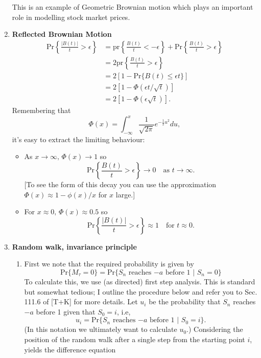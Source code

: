 \documentclass[11pt,a4paper]{article}
\begin{document}
\begin{enumerate}
    This is an example of Geometric Brownian motion which plays an important role in modelling stock market prices.
    \item \textbf{Reflected Brownian Motion}
    \begin{align*}
      \text{Pr}\left\{\frac{|B(t)|}{t} > \epsilon \right\}
      &= \text{pr}\left\{\frac{B(t)}{t}< - \epsilon\right\} + \text{Pr}\left\{\frac{B(t)}{t} > \epsilon\right\}\\
      &= 2\text{pr}\left\{\frac{B(t)}{t} > \epsilon\right\}\\
      &= 2[1 - \text{Pr}\{B(t) \leq \epsilon t\}]\\
      &= 2[1 - \Phi(\epsilon t/\sqrt{t})]\\
      &= 2[1 - \Phi(\epsilon\sqrt{t})].
    \end{align*}
    Remembering that
    $$
    \Phi(x) = \int_{-\infty}^x\frac{1}{\sqrt{2\pi}}e^{-\frac{1}{2}u^2}du,
    $$
    it's easy to extract the limiting behaviour:
    \begin{itemize}
      \item As $x \to \infty,\, \Phi(x)\to 1$ so 
      $$
      \text{Pr}\left\{\frac{B(t)}{t} > \epsilon\right\}\to 0 \quad\text{as $t \to \infty$}.
      $$
      [To see the form of this decay you can use the approximation $\Phi(x) \approx 1 - \phi(x)/x $ for $x$ large.]
      \item For $x\approx 0,\, \Phi(x) \approx 0.5$ so
      $$
      \text{Pr}\left\{\frac{|B(t)|}{t} > \epsilon\right\} \approx 1\quad \text{for $t \approx 0$}.
      $$
    \end{itemize}
    \item \textbf{Random walk, invariance principle}
    \begin{enumerate}
      \item First we note that the required probability is given by
      $$
      \text{Pr}\{M_\tau = 0\} = \text{Pr}\{\text{$S_n$ reaches $-a$ before 1 | $S_n = 0$}\}
      $$
      To calculate this, we use (as directed) first step analysis. This is standard but somewhat tedious; I outline the procedure below and refer you to Sec. 111.6 of [T+K] for more details. Let $u_i$ be the probability that $S_n$ reaches $-a$ before 1 given that $S_0 = i$, i.e,
      $$
      u_i = \text{Pr}\{\text{$S_n$ reaches $-a$ before 1 | $S_0 = i$\}}.
      $$
      (In this notation we ultimately want to calculate $u_0$.) Considering the position of the random walk after a single step from the starting point $i$, yields the difference equation
      \begin{equation}\tag{10.1}

\end{equation}
\end{enumerate}
\end{enumerate}
\end{document}
